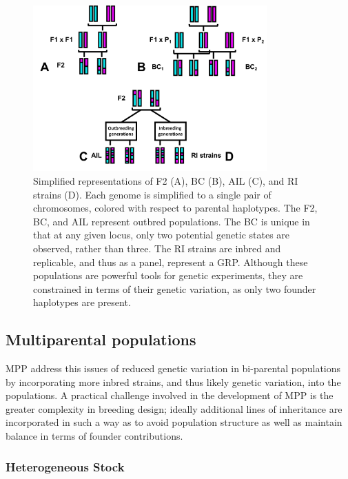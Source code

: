 \begin{figure}
\centering
\includegraphics[width=0.8\textwidth, trim={0in 0in 0in 0in}, clip]{figures/1-introduction/crosses_for_dissertation_intro.pdf}
\caption[Simplified bi-parental populations]{Simplified representations of F2 (A), BC (B), AIL (C), and RI strains (D). Each genome is simplified to a single pair of chromosomes, colored with respect to parental haplotypes. The F2, BC, and AIL represent outbred populations. The BC is unique in that at any given locus, only two potential genetic states are observed, rather than three. The RI strains are inbred and replicable, and thus as a panel, represent a GRP. Although these populations are powerful tools for genetic experiments, they are constrained in terms of their genetic variation, as only two founder haplotypes are present. \label{fig:intro_biparental_crosses}}
\end{figure}


\subsection{Multiparental populations}

MPP address this issues of reduced genetic variation in bi-parental populations by incorporating more inbred strains, and thus likely genetic variation, into the populations. A practical challenge involved in the development of MPP is the greater complexity in breeding design; ideally additional lines of inheritance are incorporated in such a way as to avoid population structure as well as maintain balance in terms of founder contributions. 

\subsubsection{Heterogeneous Stock}

